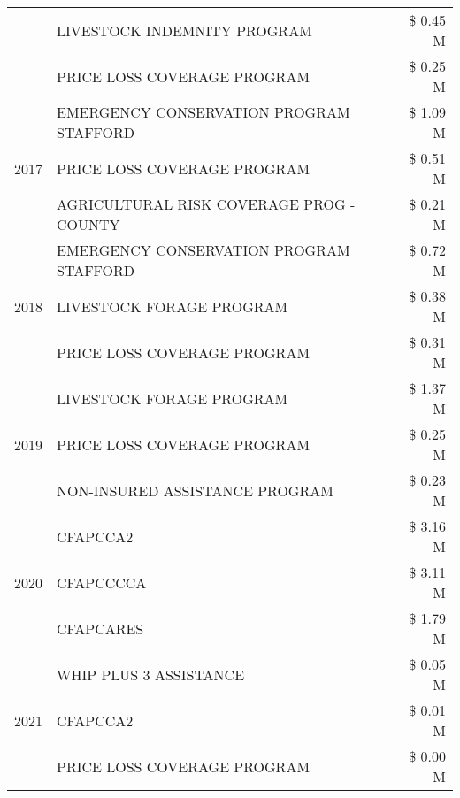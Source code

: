 \begin{tabular}{llr}
 & LIVESTOCK INDEMNITY PROGRAM & \$ 0.45 M \\
 & PRICE LOSS COVERAGE PROGRAM & \$ 0.25 M \\
\cline{1-3}
\multirow[t]{3}{*}{2017} & EMERGENCY CONSERVATION PROGRAM STAFFORD & \$ 1.09 M \\
 & PRICE LOSS COVERAGE PROGRAM & \$ 0.51 M \\
 & AGRICULTURAL RISK COVERAGE PROG - COUNTY & \$ 0.21 M \\
\cline{1-3}
\multirow[t]{3}{*}{2018} & EMERGENCY CONSERVATION PROGRAM STAFFORD & \$ 0.72 M \\
 & LIVESTOCK FORAGE PROGRAM & \$ 0.38 M \\
 & PRICE LOSS COVERAGE PROGRAM & \$ 0.31 M \\
\cline{1-3}
\multirow[t]{3}{*}{2019} & LIVESTOCK FORAGE PROGRAM & \$ 1.37 M \\
 & PRICE LOSS COVERAGE PROGRAM & \$ 0.25 M \\
 & NON-INSURED ASSISTANCE PROGRAM & \$ 0.23 M \\
\cline{1-3}
\multirow[t]{3}{*}{2020} & CFAPCCA2 & \$ 3.16 M \\
 & CFAPCCCCA & \$ 3.11 M \\
 & CFAPCARES & \$ 1.79 M \\
\cline{1-3}
\multirow[t]{3}{*}{2021} & WHIP PLUS 3 ASSISTANCE & \$ 0.05 M \\
 & CFAPCCA2 & \$ 0.01 M \\
 & PRICE LOSS COVERAGE PROGRAM & \$ 0.00 M \\
\cline{1-3}
\bottomrule
\end{tabular}
